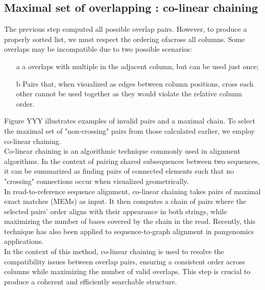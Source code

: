 \subsection{Maximal set of overlapping \kmers: co-linear chaining}
The previous step computed all possible \kmer overlap pairs. However, to produce a properly sorted list, we must respect the ordering of\kmers across all columns. Some overlaps may be incompatible due to two possible scenarios:
\begin{itemize}
	\item[a] a \kmer overlaps with multiple \kmers in the adjacent column, but can be used just once;
	\item[b] Pairs that, when visualized as edges between column positions, cross each other cannot be used together as they would violate the relative column order.
\end{itemize}
Figure YYY illustrates examples of invalid pairs and a maximal chain. To select the maximal set of "non-crossing" pairs from those calculated earlier, we employ co-linear chaining.\\
Co-linear chaining is an algorithmic technique commonly used in alignment algorithms. In the context of pairing shared subsequences between two sequences, it can be summarized as finding pairs of connected elements such that no "crossing" connections occur when visualized geometrically. \\
In read-to-reference sequence alignment, co-linear chaining takes pairs of maximal exact matches (MEMs) as input. It then computes a chain of pairs where the selected pairs' order aligns with their appearance in both strings, while maximizing the number of bases covered by the chain in the read. Recently, this technique has also been applied to sequence-to-graph alignment in pangenomics applications.\\
In the context of this method, co-linear chaining is used to resolve the compatibility issues between \kmer overlap pairs, ensuring a consistent order across columns while maximizing the number of valid overlaps. This step is crucial to produce a coherent and efficiently searchable structure.

